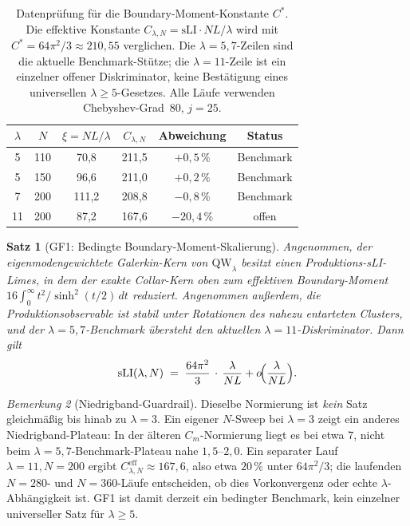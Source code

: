 ﻿\documentclass[12pt,a4paper]{article}
\newtheorem{theorem}{Satz}[section]
\theoremstyle{definition}
\theoremstyle{remark}
\newtheorem{remark}[theorem]{Bemerkung}
\begin{document}
\begin{table}[h]
\centering
\caption{Datenprüfung für die Boundary-Moment-Konstante $C^*$. Die effektive Konstante $C_{\lambda,N} = \mathrm{sLI}\cdot NL/\lambda$ wird mit $C^* = 64\pi^2/3 \approx 210{,}55$ verglichen. Die $\lambda=5,7$-Zeilen sind die aktuelle Benchmark-Stütze; die $\lambda=11$-Zeile ist ein einzelner offener Diskriminator, keine Bestätigung eines universellen $\lambda\geq5$-Gesetzes. Alle Läufe verwenden Chebyshev-Grad~$80$, $j = 25$.}
\label{tab:gf1-data}
\begin{tabular}{cccccc}
\toprule
$\lambda$ & $N$ & $\xi=NL/\lambda$ & $C_{\lambda,N}$ & Abweichung & Status \\
\midrule
5 & 110 & 70{,}8 & 211{,}5 & $+0{,}5\,\%$ & Benchmark \\
5 & 150 & 96{,}6 & 211{,}0 & $+0{,}2\,\%$ & Benchmark \\
7 & 200 & 111{,}2 & 208{,}8 & $-0{,}8\,\%$ & Benchmark \\
11 & 200 & 87{,}2 & 167{,}6 & $-20{,}4\,\%$ & offen \\
\bottomrule
\end{tabular}
\end{table}

\begin{theorem}[GF1: Bedingte Boundary-Moment-Skalierung]
\label{thm:GF1}
Angenommen, der eigenmodengewichtete Galerkin-Kern von
$\mathrm{QW}_\lambda$ besitzt einen Produktions-sLI-Limes, in dem der
exakte Collar-Kern oben zum effektiven Boundary-Moment
$16\int_0^\infty t^2/\sinh^2(t/2)\,dt$ reduziert. Angenommen außerdem,
die Produktionsobservable ist stabil unter Rotationen des nahezu entarteten
Clusters, und der $\lambda=5,7$-Benchmark übersteht den aktuellen
$\lambda=11$-Diskriminator. Dann gilt
\[
\mathrm{sLI}(\lambda, N) \;=\; \frac{64\pi^2}{3}\,\cdot\,\frac{\lambda}{NL} + o\!\Bigl(\frac{\lambda}{NL}\Bigr).
\]
\end{theorem}

\begin{remark}[Niedrigband-Guardrail]
\label{rem:gf1-lambda3}
Dieselbe Normierung ist \emph{kein} Satz gleichmäßig bis hinab zu
$\lambda=3$. Ein eigener $N$-Sweep bei $\lambda=3$ zeigt ein anderes
Niedrigband-Plateau: In der älteren $C_m$-Normierung liegt es bei etwa
$7$, nicht beim $\lambda=5,7$-Benchmark-Plateau nahe $1{,}5$--$2{,}0$.
Ein separater Lauf $\lambda=11,N=200$ ergibt
$C_{\lambda,N}^{\mathrm{eff}}\approx167{,}6$, also etwa $20\,\%$ unter
$64\pi^2/3$; die laufenden $N=280$- und $N=360$-Läufe entscheiden, ob dies
Vorkonvergenz oder echte $\lambda$-Abhängigkeit ist. GF1 ist damit derzeit
ein bedingter Benchmark, kein einzelner universeller Satz für
$\lambda\geq5$.
\end{remark}
\end{document}
